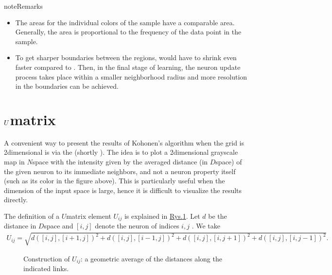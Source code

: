 \documentclass[a4paper,12pt,polish]{jupyterBook}
\let\sphinxpxdimen\pdfpxdimen\else\newdimen\sphinxpxdimen
\begin{document}
\begin{sphinxadmonition}{note}{Remarks}
\begin{itemize}
\item {} 
\sphinxAtStartPar
The areas for the individual colors of the sample have a comparable area. Generally, the area is proportional to the frequency of the data point in the sample.

\item {} 
\sphinxAtStartPar
To get sharper boundaries between the regions,  would have to shrink even faster compared to . Then, in the final stage of learning, the neuron update process takes place within a smaller neighborhood radius and more resolution in the boundaries can be achieved.

\end{itemize}
\end{sphinxadmonition}


\section{\protect\(U\protect\)\sphinxhyphen{}matrix}
\label{\detokenize{docs/som:u-matrix}}
\sphinxAtStartPar
A convenient way to present the results of Kohonen’s algorithm when the grid is 2\sphinxhyphen{}dimensional is via the  (shortly ). The idea is to plot a 2\sphinxhyphen{}dimensional grayscale map in \(N\)\sphinxhyphen{}space with the intensity given by the averaged distance (in \(D\)\sphinxhyphen{}space) of the given neuron to its immediate neighbors, and not a neuron property itself (such as its color in the figure above). This is particularly useful when the dimension of the input space is large, hence it is difficult to visualize the results directly.

\sphinxAtStartPar
The definition of a \(U\)\sphinxhyphen{}matrix element \(U_{ij}\) is explained in \hyperref[\detokenize{docs/som:udm-fig}]{Rys.\@ \ref{\detokenize{docs/som:udm-fig}}}. Let \(d\) be the distance in \(D\)\sphinxhyphen{}space and \([i,j]\) denote the neuron of indices \(i,j\) . We take
\begin{equation*}
\begin{split}
U_{ij}=\sqrt{d\left([i,j],[i+1,j]\right)^2+d\left([i,j],[i-1,j]\right)^2+
        d\left([i,j],[i,j+1]\right)^2+d\left([i,j],[i,j-1]\right)^2 }.
\end{split}
\end{equation*}
\begin{figure}[htbp]
\centering
\capstart

\noindent\sphinxincludegraphics[width=150\sphinxpxdimen]{{udm}.png}
\caption{Construction of \(U_{ij}\): a geometric average of the distances along the indicated links.}\label{\detokenize{docs/som:udm-fig}}\end{figure}
\end{document}
